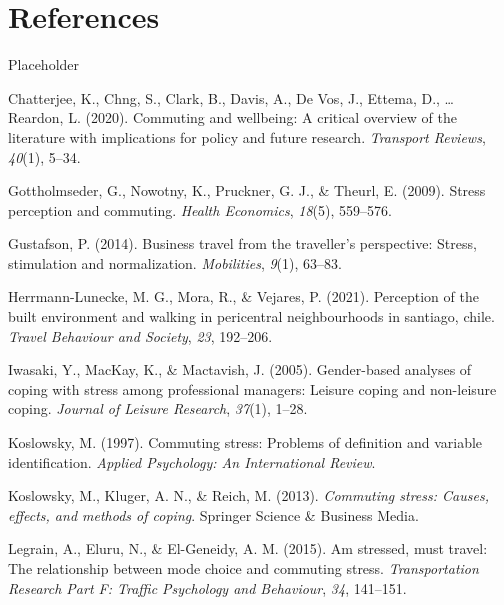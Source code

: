 \documentclass[
11pt, %
oneside, %
english, %
singlespacing, %
]{macthesis} %
\newlength{\cslhangindent}
\newenvironment{CSLReferences}[2] %
 {%
  \setlength{\parindent}{0pt}
  \ifodd #1 \everypar{\setlength{\hangindent}{\cslhangindent}}\ignorespaces\fi
  \ifnum #2 > 0
  \setlength{\parskip}{#2\baselineskip}
  \fi
 }%
 {}
\begin{document}
\hypertarget{references}{%
\chapter*{References}\label{references}}

Placeholder

\hypertarget{refs}{}
\begin{CSLReferences}{1}{0}
\leavevmode{}%
Chatterjee, K., Chng, S., Clark, B., Davis, A., De Vos, J., Ettema, D., \ldots{} Reardon, L. (2020). Commuting and wellbeing: A critical overview of the literature with implications for policy and future research. \emph{Transport Reviews}, \emph{40}(1), 5--34.

\leavevmode{}%
Gottholmseder, G., Nowotny, K., Pruckner, G. J., \& Theurl, E. (2009). Stress perception and commuting. \emph{Health Economics}, \emph{18}(5), 559--576.

\leavevmode{}%
Gustafson, P. (2014). Business travel from the traveller's perspective: Stress, stimulation and normalization. \emph{Mobilities}, \emph{9}(1), 63--83.

\leavevmode{}%
Herrmann-Lunecke, M. G., Mora, R., \& Vejares, P. (2021). Perception of the built environment and walking in pericentral neighbourhoods in santiago, chile. \emph{Travel Behaviour and Society}, \emph{23}, 192--206.

\leavevmode{}%
Iwasaki, Y., MacKay, K., \& Mactavish, J. (2005). Gender-based analyses of coping with stress among professional managers: Leisure coping and non-leisure coping. \emph{Journal of Leisure Research}, \emph{37}(1), 1--28.

\leavevmode{}%
Koslowsky, M. (1997). Commuting stress: Problems of definition and variable identification. \emph{Applied Psychology: An International Review}.

\leavevmode{}%
Koslowsky, M., Kluger, A. N., \& Reich, M. (2013). \emph{Commuting stress: Causes, effects, and methods of coping}. Springer Science \& Business Media.

\leavevmode{}%
Legrain, A., Eluru, N., \& El-Geneidy, A. M. (2015). Am stressed, must travel: The relationship between mode choice and commuting stress. \emph{Transportation Research Part F: Traffic Psychology and Behaviour}, \emph{34}, 141--151.


\end{CSLReferences}
\end{document}
